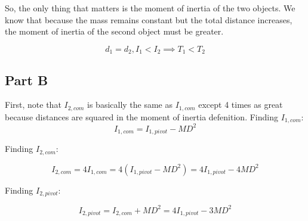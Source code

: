 \documentclass{article}
\begin{document}
So, the only thing that matters is the moment of inertia of the two objects. We know that because the mass remains constant but the total distance increases, the moment of inertia of the second object must be greater.

$$
d_1=d_2, I_1 < I_2 \implies T_1 < T_2
$$


\subsection{Part B}

First, note that $I_{2,com}$ is basically the same as $I_{1,com}$ except 4 times as great because distances are squared in the moment of inertia defenition. Finding $I_{1,com}$:
$$
I_{1,com} = I_{1,pivot} - MD^2
$$

Finding $I_{2,com}$:

$$
I_{2,com} = 4 I_{1,com} = 4(I_{1,pivot} - MD^2) = 4I_{1,pivot} - 4MD^2
$$

Finding $I_{2,pivot}$:

$$
I_{2,pivot} = I_{2,com} + MD^2 = 4I_{1,pivot} - 3MD^2
$$
\end{document}
